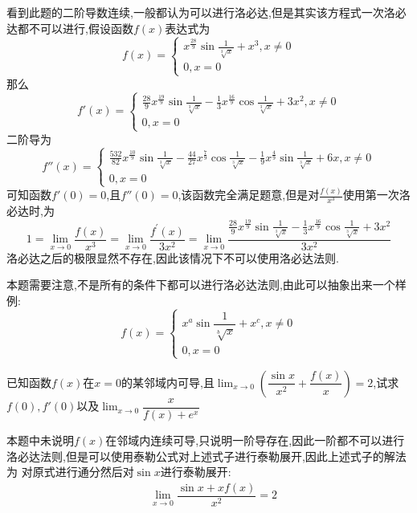 \documentclass[8pt a4paper, oneside, UTF8]{ctexbook}
\begin{document}
\begin{sloppypar}
\begin{solution}
        看到此题的二阶导数连续,一般都认为可以进行洛必达,但是其实该方程式一次洛必达都不可以进行,假设函数$f(x)$表达式为$$f\left(x\right)=\begin{cases}x^{\frac{28}{9}}\sin\frac{1}{\sqrt[3]{x}}+x^3,x\neq0\\0,x=0\end{cases}$$那么$$f'\left(x\right)=\begin{cases}\frac{28}{9}x^{\frac{19}{9}}\sin\frac{1}{\sqrt[3]{x}}-\frac{1}{3}x^{\frac{16}{9}}\cos\frac{1}{\sqrt[3]{x}}+{3x^{2}},x\neq0\\0,x=0\end{cases}$$二阶导为$$f''(x)=\begin{cases}\frac{532}{82}x^{\frac{10}{9}}\sin\frac{1}{\sqrt[3]{x}}-\frac{44}{27}x^{\frac{7}{9}}\cos\frac{1}{\sqrt[3]{x}}-\frac{1}{9}x^{\frac{4}{9}}\sin\frac{1}{\sqrt[3]{x}}+6x,x\neq0\\0,x=0\end{cases}$$可知函数$f'(0)=0$,且$f''(0)=0$,该函数完全满足题意,但是对$\frac{f(x)}{x^3}$使用第一次洛必达时,为$$1=\lim_{x\to0}\frac{f\left(x\right)}{x^{3}}=\lim_{x\to0}\frac{f^{\prime}\left(x\right)}{3x^{2}}=\lim_{x\to0}\frac{\frac{28}9x^{\frac{19}9}\sin\frac1{\sqrt[3]{x}}-\frac13x^{\frac{16}9}\cos\frac1{\sqrt[3]{x}}+3x^2}{3x^{2}}$$洛必达之后的极限显然不存在,因此该情况下不可以使用洛必达法则.
    \end{solution}
    \begin{note}
        本题需要注意,不是所有的条件下都可以进行洛必达法则,由此可以抽象出来一个样例:
        $$f\left(x\right)=\begin{cases}x^a\sin\dfrac{1}{\sqrt[b]{x}}+x^c,x\neq0\\0,x=0\end{cases}$$
    \end{note}
    \begin{problem}
        已知函数$f(x)$在$x=0$的某邻域内可导,且$\lim_{x \to 0}(\dfrac{\sin x}{x^2}+\dfrac{f(x)}{x})=2$,试求$f(0),f'(0)$以及$\lim_{x\to0}\dfrac{x}{f(x)+e^x}$
    \end{problem}
    \begin{solution}
        本题中未说明$f(x)$在邻域内连续可导,只说明一阶导存在,因此一阶都不可以进行洛必达法则,但是可以使用泰勒公式对上述式子进行泰勒展开,因此上述式子的解法为
        对原式进行通分然后对$\sin x$进行泰勒展开:
        \begin{equation*}
            \begin{split}    
                & \lim_{x \to 0}\dfrac{\sin x+xf(x)}{x^2}=2\\

\end{split}
\end{equation*}
\end{solution}
\end{sloppypar}
\end{document}
